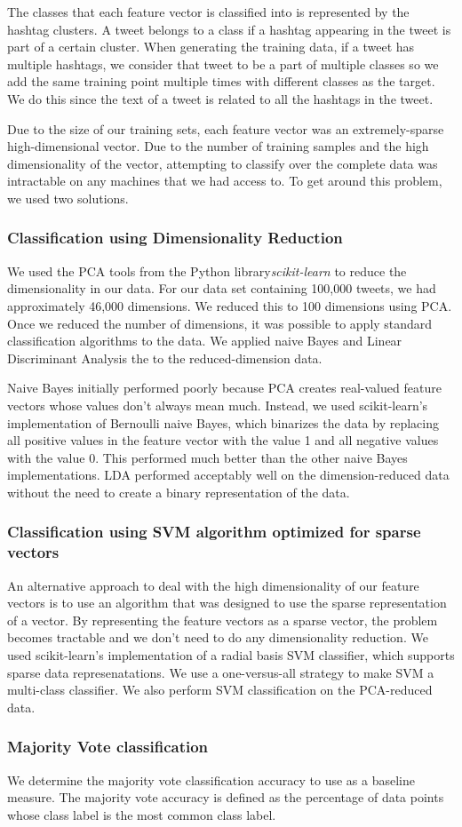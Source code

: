 The classes that each feature vector is classified into is represented by the hashtag clusters. A tweet belongs to a class if a hashtag appearing in the tweet is part of a certain cluster. When generating the training data, if a tweet has multiple hashtags, we consider that tweet to be a part of multiple classes so we add the same training point multiple times with different classes as the target. We do this since the text of a tweet is related to all the hashtags in the tweet.  

Due to the size of our training sets, each feature vector was an extremely-sparse high-dimensional vector. Due to the number of training samples and the high dimensionality of the vector, attempting to classify over the complete data was intractable on any machines that we had access to. To get around this problem, we used two solutions.

\subsubsection{Classification using Dimensionality Reduction}

We used the PCA tools from the Python library{\it scikit-learn} to reduce the dimensionality in our data. For our data set containing 100,000 tweets, we had approximately 46,000 dimensions. We reduced this to 100 dimensions using PCA. Once we reduced the number of dimensions, it was possible to apply standard classification algorithms to the data. We applied naive Bayes and Linear Discriminant Analysis the to the reduced-dimension data.

Naive Bayes initially performed poorly because PCA creates real-valued feature vectors whose values don't always mean much. Instead, we used scikit-learn's implementation of Bernoulli naive Bayes, which binarizes the data by replacing all positive values in the feature vector with the value 1 and all negative values with the value 0. This performed much better than the other naive Bayes implementations. LDA performed acceptably well on the dimension-reduced data without the need to create a binary representation of the data.

\subsubsection{Classification using SVM algorithm optimized for sparse vectors}
An alternative approach to deal with the high dimensionality of our feature vectors is to use an algorithm that was designed to use the sparse representation of a vector. By representing the feature vectors as a sparse vector, the problem becomes tractable and we don't need to do any dimensionality reduction. We used scikit-learn's implementation of a radial basis SVM classifier, which supports sparse data represenatations. We use a one-versus-all strategy to make SVM a multi-class classifier. We also perform SVM classification on the PCA-reduced data.

\subsubsection{Majority Vote classification}
We determine the majority vote classification accuracy to use as a baseline measure. The majority vote accuracy is defined as the percentage of data points whose class label is the most common class label.
